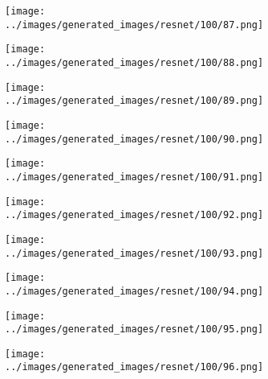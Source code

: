 \begin{figure}[H]
\begin{subfigure}[b]{0.1\textwidth}
\centering
\texttt{[image: ../images/generated\_images/resnet/100/87.png]}
\end{subfigure}
\hspace{1em}%
\begin{subfigure}[b]{0.1\textwidth}
\centering
\texttt{[image: ../images/generated\_images/resnet/100/88.png]}
\end{subfigure}
\hspace{1em}%
\begin{subfigure}[b]{0.1\textwidth}
\centering
\texttt{[image: ../images/generated\_images/resnet/100/89.png]}
\end{subfigure}
\hspace{1em}%
\begin{subfigure}[b]{0.1\textwidth}
\centering
\texttt{[image: ../images/generated\_images/resnet/100/90.png]}
\end{subfigure}
\hspace{1em}%
\begin{subfigure}[b]{0.1\textwidth}
\centering
\texttt{[image: ../images/generated\_images/resnet/100/91.png]}
\end{subfigure}
\hspace{1em}%
\begin{subfigure}[b]{0.1\textwidth}
\centering
\texttt{[image: ../images/generated\_images/resnet/100/92.png]}
\end{subfigure}
\hspace{1em}%
\begin{subfigure}[b]{0.1\textwidth}
\centering
\texttt{[image: ../images/generated\_images/resnet/100/93.png]}
\end{subfigure}
\hspace{1em}%
\begin{subfigure}[b]{0.1\textwidth}
\centering
\texttt{[image: ../images/generated\_images/resnet/100/94.png]}
\end{subfigure}
\hspace{1em}%
\begin{subfigure}[b]{0.1\textwidth}
\centering
\texttt{[image: ../images/generated\_images/resnet/100/95.png]}
\end{subfigure}
\hspace{1em}%
\begin{subfigure}[b]{0.1\textwidth}
\centering
\texttt{[image: ../images/generated\_images/resnet/100/96.png]}

\end{subfigure}
\end{figure}
